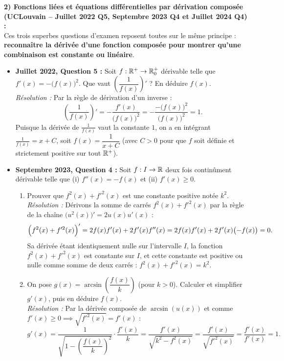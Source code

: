 \begin{exemple}
\medskip
\textbf{2) Fonctions liées et équations différentielles par dérivation composée (UCLouvain -- Juillet 2022 Q5, Septembre 2023 Q4 et Juillet 2024 Q4) :}\\
Ces trois superbes questions d'examen reposent toutes sur le même principe : \textbf{reconnaître la dérivée d'une fonction composée pour montrer qu'une combinaison est constante ou linéaire}.
\begin{itemize}
    \item \textbf{Juillet 2022, Question 5 :} Soit $f : \mathbb{R}^+ \to \mathbb{R}_0^+$ dérivable telle que $f'(x) = -\bigl(f(x)\bigr)^2$. Que vaut $\left(\dfrac{1}{f(x)}\right)'$ ? En déduire $f(x)$.\\
    \emph{Résolution :} Par la règle de dérivation d'un inverse :
    \[
        \left(\frac{1}{f(x)}\right)' = -\frac{f'(x)}{\bigl(f(x)\bigr)^2} = -\frac{-\bigl(f(x)\bigr)^2}{\bigl(f(x)\bigr)^2} = 1.
    \]
    Puisque la dérivée de $\frac{1}{f(x)}$ vaut la constante $1$, on a en intégrant $\frac{1}{f(x)} = x + C$, soit $\boxed{f(x) = \dfrac{1}{x + C}}$ (avec $C > 0$ pour que $f$ soit définie et strictement positive sur tout $\mathbb{R}^+$).
    \item \textbf{Septembre 2023, Question 4 :} Soit $f : I \to \mathbb{R}$ deux fois continûment dérivable telle que (i) $f''(x) = -f(x)$ et (ii) $f'(x) \ge 0$.
    \begin{enumerate}[label=\alph*)]
        \item Prouver que $f^2(x) + f'^2(x)$ est une constante positive notée $k^2$.\\
        \emph{Résolution :} Dérivons la somme de carrés $f^2(x) + f'^2(x)$ par la règle de la chaîne $\bigl(u^2(x)\bigr)' = 2u(x)u'(x)$ :
        \[
            \Bigl(f^2(x) + f'^2(x)\Bigr)' = 2f(x)f'(x) + 2f'(x)f''(x) = 2f(x)f'(x) + 2f'(x)\bigl(-f(x)\bigr) = 0.
        \]
        Sa dérivée étant identiquement nulle sur l'intervalle $I$, la fonction $f^2(x) + f'^2(x)$ est constante sur $I$, et cette constante est positive ou nulle comme somme de deux carrés : $f^2(x) + f'^2(x) = k^2$.
        \item On pose $g(x) = \arcsin\left(\dfrac{f(x)}{k}\right)$ (pour $k > 0$). Calculer et simplifier $g'(x)$, puis en déduire $f(x)$.\\
        \emph{Résolution :} Par la dérivée composée de $\arcsin(u(x))$ et comme $f'(x) \ge 0 \implies \sqrt{f'^2(x)} = f'(x)$ :
        \[
            g'(x) = \frac{1}{\sqrt{1 - \left(\dfrac{f(x)}{k}\right)^2}} \cdot \frac{f'(x)}{k} = \frac{f'(x)}{\sqrt{k^2 - f^2(x)}} = \frac{f'(x)}{\sqrt{f'^2(x)}} = \frac{f'(x)}{f'(x)} = \boxed{1}.
\]
\end{enumerate}
\end{itemize}
\end{exemple}
